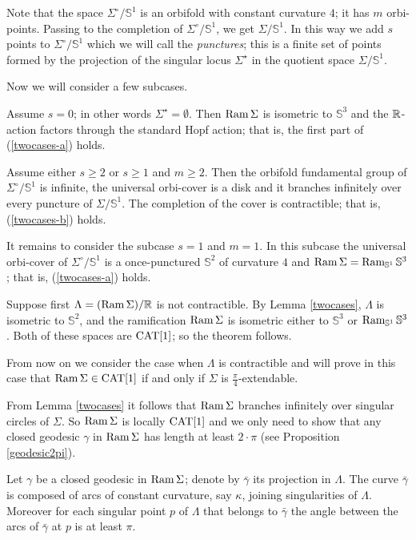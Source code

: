\documentclass[oneside,a4paper]{article}
\begin{document}
Note that the space $\Sigma^\circ/\mathbb{S}^1$ is an orbifold with constant curvature $4$;
it has $m$ orbi-points.
Passing to the completion of $\Sigma^\circ/\mathbb{S}^1$, we get $\Sigma/\mathbb{S}^1$.
In this way we add $s$ points to $\Sigma^\circ/\mathbb{S}^1$
which we will call the \emph{punctures};
this is a finite set of points formed by the projection of the singular locus $\Sigma^{{\star}}$
in the quotient space $\Sigma/\mathbb{S}^1$.

Now we will consider a few subcases.

Assume $s=0$; in other words $\Sigma^{{\star}}=\emptyset$.
Then $\mathop{\rm Ram}\nolimits\Sigma$ is isometric to $\mathbb{S}^3$
and the $\mathbb{R}$-action factors through the standard Hopf action;
that is, the first part of (\ref{twocases-a}) holds.

Assume either $s\ge 2$ or $s\ge 1$ and $m\ge 2$.
Then the orbifold fundamental group of $\Sigma^\circ/\mathbb{S}^1$ is infinite, the universal orbi-cover is a disk and it branches
infinitely over every puncture of $\Sigma/\mathbb{S}^1$.
The completion of the cover is contractible; 
that is, (\ref{twocases-b}) holds.

It remains to consider the subcase $s=1$ and $m=1$.
In this subcase the universal orbi-cover of $\Sigma^\circ/\mathbb{S}^1$ is a once-punctured $\mathbb{S}^2$ of curvature $4$ and $\mathop{\rm Ram}\nolimits \Sigma=\mathop{\rm Ram}\nolimits_{\mathbb{S}^1}\mathbb{S}^3$; 
that is, (\ref{twocases-a}) holds.
\qeds


Suppose first $\Lambda=(\mathop{\rm Ram}\nolimits \Sigma)/\mathbb{R}$ is not contractible.
By Lemma \ref{twocases}, $\Lambda$ is isometric to $\mathbb{S}^2$,
and the ramification $\mathop{\rm Ram}\nolimits\Sigma$ is
isometric either to $\mathbb{S}^3$ or $\mathop{\rm Ram}\nolimits_{\mathbb{S}^1}\mathbb{S}^3$.
Both of these spaces are $\mathrm{CAT}[1]$;
so the theorem follows.

From now on we consider the case when $\Lambda$ is contractible and will
prove in this case that $\mathop{\rm Ram}\nolimits\Sigma\in \mathrm{CAT}[1]$
if and only if $\Sigma$ is $\frac{\pi}{4}$-extendable.

From Lemma \ref{twocases} it follows that $\mathop{\rm Ram}\nolimits \Sigma$ branches infinitely
over singular circles of $\Sigma$.
So  $\mathop{\rm Ram}\nolimits \Sigma$ is locally $\mathrm{CAT}[1]$ and we only need to show that
any closed geodesic $\gamma$ in $\mathop{\rm Ram}\nolimits \Sigma$
has length at least $2{\cdot}\pi$
(see Proposition \ref{geodesic2pi}).

Let $\gamma$ be a closed geodesic in $\mathop{\rm Ram}\nolimits \Sigma$;
denote by $\bar\gamma$ its projection in $\Lambda$.
The curve $\bar\gamma$ is composed
of arcs of constant curvature, say $\kappa$, joining  singularities of $\Lambda$.
Moreover for each singular point $p$ of $\Lambda$ that belongs to $\bar\gamma$ the angle
between the arcs of $\bar\gamma$ at $p$ is at least $\pi$.
\end{document}

